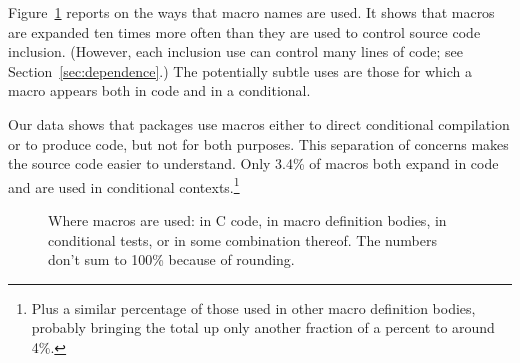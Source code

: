 \documentclass[10pt]{article}
\newcommand{\captionsmall}[1]{\caption[]{\small #1}}
\begin{document}
\noindent Figure~\ref{fig:where-used} reports on the ways that macro
names are used.  It shows that macros are expanded ten times more often
than they are used to control source code inclusion.  (However, each
inclusion use can control many lines of code; see
Section~\ref{sec:dependence}.)  The potentially subtle uses are those
for which a macro appears both in code and in a conditional.

Our data shows that packages use macros either to direct conditional
compilation or to produce code, but not for both purposes. This
separation of concerns makes the source code easier to understand.  Only
3.4\% of macros both expand in code and are used in conditional
contexts.\footnote{Plus a similar percentage of those used in other
  macro definition bodies, probably bringing the total up only another
  fraction of a percent to around 4\%.}  



\begin{figure}
\centerline{\small
  \setlength{\tabcolsep}{.25em}
}
\captionsmall{Where macros are used: in C code, in macro definition bodies, in
  conditional tests, or in some combination thereof.  The numbers don't sum to
  100\% because of rounding.}
\label{fig:where-used}
\end{figure}



\end{document}
